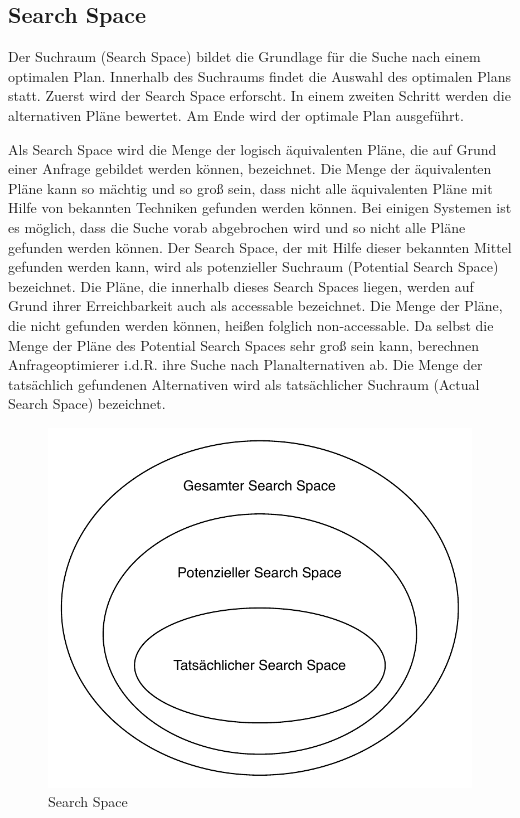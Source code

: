 \subsection{Search Space}

Der Suchraum (Search Space) bildet die Grundlage für die Suche nach einem optimalen Plan. Innerhalb des Suchraums findet die Auswahl des optimalen Plans statt. 
Zuerst wird der Search Space erforscht. In einem zweiten Schritt werden die alternativen Pläne bewertet. Am Ende wird der optimale Plan ausgeführt.



Als Search Space wird die Menge der logisch äquivalenten Pläne, die auf Grund einer Anfrage gebildet werden können, bezeichnet. Die Menge der äquivalenten Pläne kann so mächtig und so groß sein, dass nicht alle äquivalenten Pläne mit Hilfe von bekannten Techniken gefunden werden können. Bei einigen Systemen ist es möglich, dass die Suche vorab abgebrochen wird und so nicht alle Pläne gefunden werden können. Der Search Space, der mit Hilfe dieser bekannten Mittel gefunden werden kann, wird als potenzieller Suchraum (Potential Search Space) bezeichnet. Die Pläne, die innerhalb dieses Search Spaces liegen, werden auf Grund ihrer Erreichbarkeit auch als accessable bezeichnet. Die Menge der Pläne, die nicht gefunden werden können, heißen folglich non-accessable. Da selbst die Menge der Pläne des Potential Search Spaces sehr groß sein kann, berechnen Anfrageoptimierer i.d.R. ihre Suche nach Planalternativen ab. Die Menge der tatsächlich gefundenen Alternativen wird als tatsächlicher Suchraum (Actual Search Space) bezeichnet.


\begin{figure}[ht]
  \centering
  \includegraphics[scale=0.75]{02_Related_Work/SearchSpace.pdf}
  \caption{Search Space}
  \label{SearchSpace}
\end{figure}

